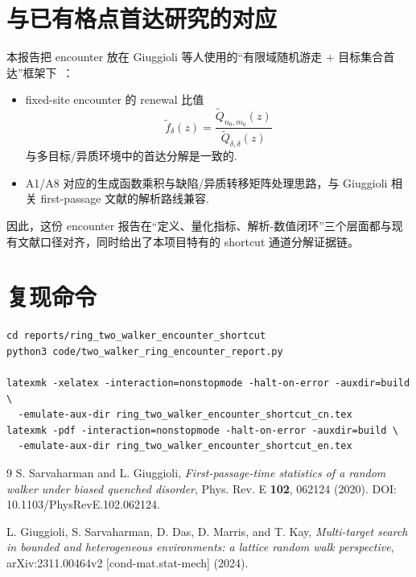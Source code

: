 \documentclass[11pt]{article}
\begin{document}
\section{与已有格点首达研究的对应}
本报告把 encounter 放在 Giuggioli 等人使用的“有限域随机游走 + 目标集合首达”框架下~\cite{sarvaharman2020pre,giuggioli2024multi}：
\begin{itemize}[leftmargin=1.4em]
  \item fixed-site encounter 的 renewal 比值
  \[
  \widetilde f_\delta(z)=\frac{\widetilde Q_{n_0,m_0}(z)}{\widetilde Q_{\delta,\delta}(z)}
  \]
  与多目标/异质环境中的首达分解是一致的\cite{giuggioli2024multi}.
  \item A1/A8 对应的生成函数乘积与缺陷/异质转移矩阵处理思路，与 Giuggioli 相关 first-passage 文献的解析路线兼容\cite{sarvaharman2020pre}.
\end{itemize}
因此，这份 encounter 报告在“定义、量化指标、解析-数值闭环”三个层面都与现有文献口径对齐，同时给出了本项目特有的 shortcut 通道分解证据链。

\section{复现命令}
\begin{verbatim}
cd reports/ring_two_walker_encounter_shortcut
python3 code/two_walker_ring_encounter_report.py

latexmk -xelatex -interaction=nonstopmode -halt-on-error -auxdir=build \
  -emulate-aux-dir ring_two_walker_encounter_shortcut_cn.tex
latexmk -pdf -interaction=nonstopmode -halt-on-error -auxdir=build \
  -emulate-aux-dir ring_two_walker_encounter_shortcut_en.tex
\end{verbatim}

\begin{thebibliography}{9}
S. Sarvaharman and L. Giuggioli,
\emph{First-passage-time statistics of a random walker under biased quenched disorder},
Phys. Rev. E \textbf{102}, 062124 (2020).
DOI: 10.1103/PhysRevE.102.062124.

L. Giuggioli, S. Sarvaharman, D. Das, D. Marris, and T. Kay,
\emph{Multi-target search in bounded and heterogeneous environments: a lattice random walk perspective},
arXiv:2311.00464v2 [cond-mat.stat-mech] (2024).
\end{thebibliography}
\end{document}
